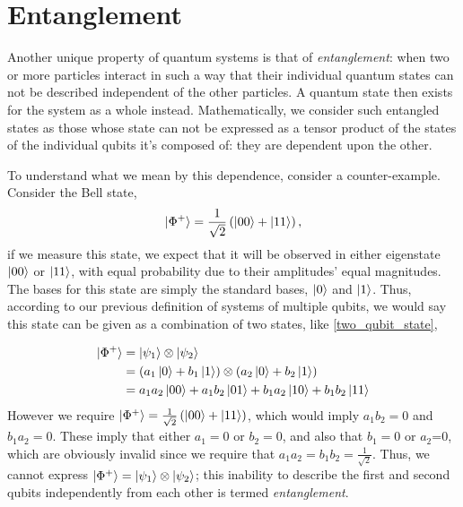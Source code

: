 \section{Entanglement}\label{sec:entanglement}
Another unique property of quantum systems is that of \emph{entanglement}: 
    when two or more particles interact in such a way that their individual quantum states can not be described independent of the other particles. 
A quantum state then exists for the system as a whole instead. 
Mathematically, we consider such entangled states as those whose state can not be expressed as a tensor product of the states of the individual qubits it's composed of: they are dependent upon the other. 
\par
To understand what we mean by this dependence, consider a counter-example. 
Consider the Bell state,
\begin{equation}
    \ket{\Phi^{+}} = \frac{1}{\sqrt{2}} \left( \ket{00} + \ket{11} \right),
\end{equation}
if we measure this state, we expect that it will be observed in either eigenstate $\ket{00} $ or $ \ket{11}$, 
    with equal probability due to their amplitudes' equal magnitudes. 
The bases for this state are simply the standard bases, $\ket{0}$ and $\ket{1}$. 
Thus, according to our previous definition of systems of multiple qubits, we would say this state can be given as a combination of two states, like \cref{two_qubit_state}, 

\begin{equation}
    \begin{split}
        \ket{\Phi^{+}} &= \ket{\psi_1} \otimes \ket{\psi_2} 
        \\ &=  \left( a_1 \ket{0} + b_1 \ket{1} \right) \otimes \left( a_2 \ket{0} + b_2 \ket{1} \right)
        \\ &= a_1a_2 \ket{00} + a_1b_2 \ket{01} + b_1a_2 \ket{10} + b_1b_2\ket{11} 
    \end{split}
\end{equation}
However we require $\ket{\Phi^{+}} = \frac{1}{\sqrt{2}} \left( \ket{00} + \ket{11} \right) $, 
    which would imply $a_1b_2 = 0$ and $b_1a_2 = 0$. 
These imply that either $a_1 =0$ or $b_2=0$, and also that $b_1=0$ or $a_2$=0, which are obviously invalid since we require that $a_1a_2 = b_1b_2 = \frac{1}{\sqrt{2}} $. 
Thus, we cannot express $ |\Phi^+ \rangle=  \ket{\psi_1} \otimes \ket{\psi_2} $;
    this inability to describe the first and second qubits independently from each other is termed \emph{entanglement}. 

